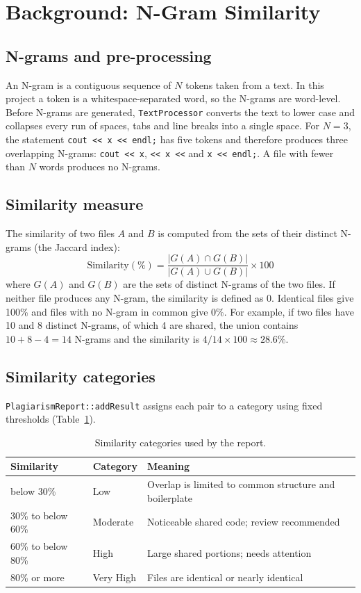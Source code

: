 \documentclass[12pt,a4paper,oneside]{book}
\begin{document}
\section{Background: N-Gram Similarity}
\subsection{N-grams and pre-processing}
An N-gram is a contiguous sequence of $N$ tokens taken from a text. In this project a token is a whitespace-separated word, so the N-grams are word-level. Before N-grams are generated, \texttt{TextProcessor} converts the text to lower case and collapses every run of spaces, tabs and line breaks into a single space. For $N = 3$, the statement \texttt{cout << x << endl;} has five tokens and therefore produces three overlapping N-grams: \texttt{cout << x}, \texttt{<< x <<} and \texttt{x << endl;}. A file with fewer than $N$ words produces no N-grams.

\subsection{Similarity measure}
The similarity of two files $A$ and $B$ is computed from the sets of their distinct N-grams (the Jaccard index):
\[
  \text{Similarity}(\%) = \frac{|G(A)\cap G(B)|}{|G(A)\cup G(B)|}\times 100
\]
where $G(A)$ and $G(B)$ are the sets of distinct N-grams of the two files. If neither file produces any N-gram, the similarity is defined as 0. Identical files give 100\% and files with no N-gram in common give 0\%. For example, if two files have 10 and 8 distinct N-grams, of which 4 are shared, the union contains $10+8-4=14$ N-grams and the similarity is $4/14\times100\approx28.6\%$.

\subsection{Similarity categories}
\texttt{PlagiarismReport::addResult} assigns each pair to a category using fixed thresholds (Table~\ref{tab:categories}).

\begin{table}[H]
\centering
\begin{tabular}{@{}lll@{}}
\toprule
Similarity & Category & Meaning \\
\midrule
below 30\% & Low & Overlap is limited to common structure and boilerplate \\
30\% to below 60\% & Moderate & Noticeable shared code; review recommended \\
60\% to below 80\% & High & Large shared portions; needs attention \\
80\% or more & Very High & Files are identical or nearly identical \\
\bottomrule
\end{tabular}
\caption{Similarity categories used by the report.}
\label{tab:categories}
\end{table}
\end{document}
